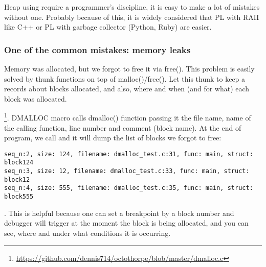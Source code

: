 {Heap using require a programmer's discipline, it is easy to make a lot
of mistakes without one}.
{Probably because of this, it is widely considered that \ac{PL} with 
\ac{RAII} like C++
or PL with garbage collector (Python, Ruby) are easier}.

\subsubsection{
{One of the common mistakes: memory leaks}}

{Memory was allocated, but we forgot to free it via} free().
{This problem is easily solved by thunk functions on top of
malloc()/free()}.
{Let this thunk to keep a records about blocks allocated, and also,
where and when (and for what) each block was allocated}.

\footnote{\url{https://github.com/dennis714/octothorpe/blob/master/dmalloc.c}}. 
{DMALLOC macro calls dmalloc() function passing it the file name, name of the calling function,
line number and comment (block name)}.
{At the end of program, we call}
 
{and it will dump the list of blocks we forgot to free}:

\begin{lstlisting}
seq_n:2, size: 124, filename: dmalloc_test.c:31, func: main, struct: block124
seq_n:3, size: 12, filename: dmalloc_test.c:33, func: main, struct: block12
seq_n:4, size: 555, filename: dmalloc_test.c:35, func: main, struct: block555
\end{lstlisting}

.
{This is helpful because one can set a breakpoint by a block number and debugger will trigger at the moment
the block is being allocated, and you can see, where and under what conditions it is occurring}.

